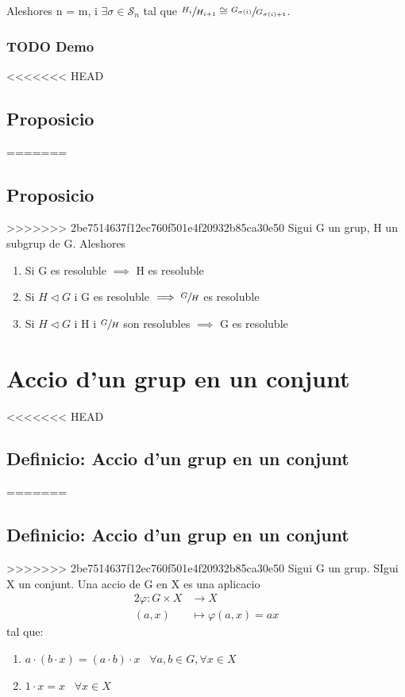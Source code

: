 \documentclass[11pt]{article}
\begin{document}
Aleshores n = m, i \(\exists \sigma \in \mathcal{S}_n\) tal que \(\sfrac{H_i}{H_{i+1}} \cong \sfrac{G_{\sigma(i)}}{G_{\sigma(i)+1}}\).

\subsubsection{{\bfseries\sffamily TODO} Demo}
<<<<<<< HEAD
\label{sec:orgd799200}

\subsection{Proposicio}
\label{sec:org8edbe5d}
=======
\label{sec:orgdac773a}

\subsection{Proposicio}
\label{sec:org8c27c84}
>>>>>>> 2be7514637f12ec760f501e4f20932b85ca30e50
Sigui G un grup, H un subgrup de G. Aleshores
\begin{enumerate}
\item Si G es resoluble \(\implies\) H es resoluble
\item Si \(H \vartriangleleft G\) i G es resoluble \(\implies \sfrac{G}{H}\) es resoluble
\item Si \(H \vartriangleleft G\) i H i \(\sfrac{G}{H}\) son resolubles \(\implies\) G es resoluble
\end{enumerate}

\section{Accio d'un grup en un conjunt}
<<<<<<< HEAD
\label{sec:orgf68e2d3}
\subsection{Definicio: Accio d'un grup en un conjunt}
\label{sec:org64225db}
=======
\label{sec:orgd0ed7f2}
\subsection{Definicio: Accio d'un grup en un conjunt}
\label{sec:org62ee780}
>>>>>>> 2be7514637f12ec760f501e4f20932b85ca30e50
Sigui G un grup. SIgui X un conjunt. Una accio de G en X es una aplicacio
\begin{alignat*}{2}
\varphi : G \times X &\to X \\
(a, x) &\mapsto \varphi(a,x) = ax
\end{alignat*}
tal que:
\begin{enumerate}
\item \(a \cdot (b \cdot x) = (a \cdot b) \cdot x \hspace{10pt}  \forall a,b \in G, \forall x \in X\)
\item \(1 \cdot x = x \hspace{10pt} \forall x \in X\)
\end{enumerate}
\end{document}
